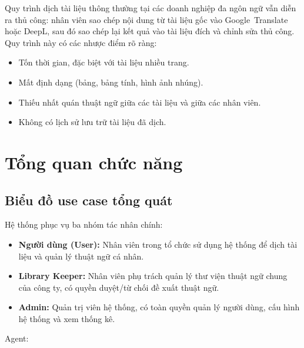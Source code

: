 Quy trình dịch tài liệu thông thường tại các doanh nghiệp đa ngôn ngữ vẫn diễn ra thủ công:
nhân viên sao chép nội dung từ tài liệu gốc vào Google~Translate hoặc DeepL, sau đó sao chép
lại kết quả vào tài liệu đích và chỉnh sửa thủ công. Quy trình này có các nhược điểm rõ ràng:

\begin{itemize}
  \item Tốn thời gian, đặc biệt với tài liệu nhiều trang.
  \item Mất định dạng (bảng, bảng tính, hình ảnh nhúng).
  \item Thiếu nhất quán thuật ngữ giữa các tài liệu và giữa các nhân viên.
  \item Không có lịch sử lưu trữ tài liệu đã dịch.
\end{itemize}

\section{Tổng quan chức năng}

\subsection{Biểu đồ use case tổng quát}

Hệ thống phục vụ ba nhóm tác nhân chính:

\begin{itemize}
  \item \textbf{Người dùng (User):} Nhân viên trong tổ chức sử dụng hệ thống để dịch tài liệu và quản
    lý thuật ngữ cá nhân.
  \item \textbf{Library Keeper:} Nhân viên phụ trách quản lý thư viện thuật ngữ chung của công
    ty, có quyền duyệt/từ chối đề xuất thuật ngữ.
  \item \textbf{Admin:} Quản trị viên hệ thống, có toàn quyền quản lý người dùng, cấu hình hệ
    thống và xem thống kê.
\end{itemize}

Agent:

